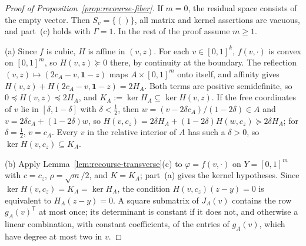 \begin{proof}[Proof of Proposition~\ref{prop:recourse-fiber}]
If $m=0$, the residual space consists of the empty vector. Then
$S_v=\{()\}$, all matrix and kernel assertions are vacuous, and part~(c)
holds with $\Gamma=1$. In the rest of the proof assume $m\ge1$.

(a) Since $f$ is cubic, $H$ is affine in $(v,z)$. For each
$v\in[0,1]^k$, $f(v,\cdot)$ is convex on $[0,1]^m$, so $H(v,z)\succeq0$
there, by continuity at the boundary. The reflection
$(v,z)\mapsto(2c_A-v,\mathbf1-z)$ maps $A\times[0,1]^m$ onto itself, and
affinity gives $H(v,z)+H(2c_A-v,\mathbf1-z)=2H_A$. Both terms are
positive semidefinite, so $0\preceq H(v,z)\preceq2H_A$, and
$K_A:=\ker H_A\subseteq\ker H(v,z)$. If the free coordinates of $v$ lie in
$[\delta,1-\delta]$ with $\delta<\frac12$, then
$w=(v-2\delta c_A)/(1-2\delta)\in A$ and $v=2\delta c_A+(1-2\delta)w$, so
$H(v,c_z)=2\delta H_A+(1-2\delta)H(w,c_z)\succeq2\delta H_A$; for
$\delta=\frac12$, $v=c_A$. Every $v$ in the relative interior of $A$ has
such a $\delta>0$, so $\ker H(v,c_z)\subseteq K_A$.

(b) Apply Lemma~\ref{lem:recourse-transverse}(c) to $\varphi=f(v,\cdot)$
on $Y=[0,1]^m$ with $c=c_z$, $\rho=\sqrt m/2$, and $K=K_A$; part~(a)
gives the kernel hypotheses. Since $\ker H(v,c_z)=K_A=\ker H_A$, the
condition $H(v,c_z)(z-y)=0$ is equivalent to $H_A(z-y)=0$. A square
submatrix of $J_A(v)$ contains the row $g_A(v)^{\mathsf T}$ at most once;
its determinant is constant if it does not, and otherwise a linear
combination, with constant coefficients, of the entries of $g_A(v)$,
which have degree at most two in $v$.


\end{proof}
